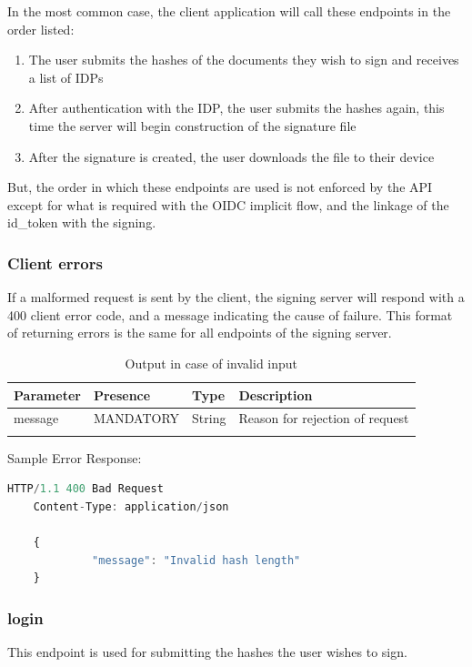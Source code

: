 In the most common case, the client application will call these endpoints in the order listed:
\begin{enumerate}
	\item The user submits the hashes of the documents they wish to sign and receives a list of IDPs
	\item After authentication with the IDP, the user submits the hashes again, this time the server will begin construction of the signature file
	\item After the signature is created, the user downloads the file to their device
\end{enumerate}

But, the order in which these endpoints are used is not enforced by the API except for what is required with the \gls{OIDC} implicit flow,
and the linkage of the id\_token with the signing.

\subsubsection{Client errors}
\label{apiclienterrors}
If a malformed request is sent by the client, the signing server will respond with a 400 client error code,
and a message indicating the cause of failure.
This format of returning errors is the same for all endpoints of the signing server.

\begin{longtable}{|l|l|l|l|}
	\hline
	\textbf{Parameter} & \textbf{Presence} & \textbf{Type} & \textbf{Description} \\ \hline
    message & MANDATORY & String & Reason for rejection of request \\ \hline
	\caption{Output in case of invalid input}
\end{longtable}

Sample Error Response:
\begin{lstlisting}[caption={Error response}, captionpos=b, language=JavaScript, label={lst:hashesresponse}]
	HTTP/1.1 400 Bad Request
	Content-Type: application/json

	{
             "message": "Invalid hash length"
	}
\end{lstlisting}

\subsubsection{login}
This endpoint is used for submitting the hashes the user wishes to sign.

